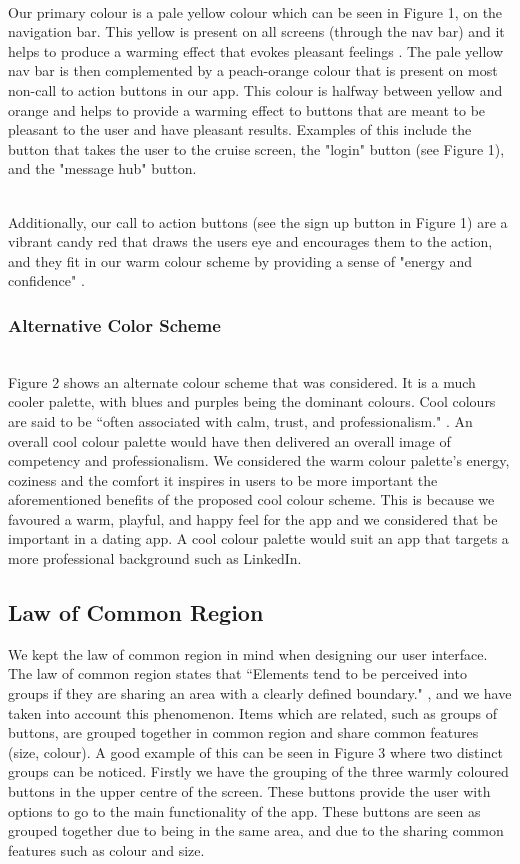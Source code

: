 \documentclass[a4paper, 11pt]{article}
\begin{document}
~\\
Our primary colour is a pale yellow colour which can be seen in Figure 1, on the navigation bar. This yellow is present on all screens (through the nav bar) and it helps to produce a warming effect that evokes pleasant feelings \cite{color}. The pale yellow nav bar is then complemented by a peach-orange colour that is present on most non-call to action buttons in our app. This colour is halfway between yellow and orange and helps to provide a warming effect to buttons that are meant to be pleasant to the user and have pleasant results. Examples of this include the button that takes the user to the cruise screen, the "login" button (see Figure 1), and the "message hub" button. 

~\\
Additionally, our call to action buttons (see the sign up button in Figure 1) are a vibrant candy red that draws the users eye and encourages them to the action, and they fit in our warm colour scheme by providing a sense of "energy and confidence" \cite{color}.

\subsubsection{Alternative Color Scheme}

~\\
Figure 2 shows an alternate colour scheme that was considered. It is a much cooler palette, with blues and purples being the dominant colours. Cool colours are said to be ``often associated with calm, trust, and professionalism." \cite{color}. An overall cool colour palette would have then delivered an overall image of competency and professionalism. We considered the warm colour palette's energy, coziness and the comfort it inspires in users to be more important the aforementioned benefits of the proposed cool colour scheme. This is because we favoured a warm, playful, and happy feel for the app and we considered that be important in a dating app. A cool colour palette would suit an app that targets a more professional background such as LinkedIn.


\subsection{Law of Common Region}
We kept the law of common region \cite{commonRegion} in mind when designing our user interface. The law of common region states that ``Elements tend to be perceived into groups if they are sharing an area with a clearly defined boundary." \cite{commonRegion}, and we have taken into account this phenomenon. Items which are related, such as groups of buttons, are grouped together in common region and share common features (size, colour). A good example of this can be seen in Figure 3 where two distinct groups can be noticed. Firstly we have the grouping of the three warmly coloured buttons in the upper centre of the screen. These buttons provide the user with options to go to the main functionality of the app. These buttons are seen as grouped together due to being in the same area, and due to the sharing common features such as colour and size.
\end{document}
